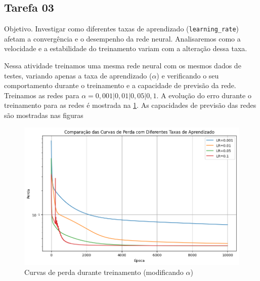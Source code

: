 \subsection{Tarefa 03}

\begin{comandoquestao}
Objetivo. Investigar como diferentes taxas de aprendizado 
(\texttt{learning\_rate}) afetam a 
convergência e o desempenho da rede neural. Analisaremos como a velocidade e a 
estabilidade do treinamento variam com a alteração dessa taxa.
\end{comandoquestao}

Nessa atividade treinamos uma mesma rede neural com os mesmos dados de testes, 
variando apenas a taxa de aprendizado ($\alpha$) e verificando o seu 
comportamento durante 
o treinamento e a capacidade de previsão da rede. Treinamos as redes para 
$\alpha = 0,001 | 0,01 | 0,05 | 0,1$. A evolução do erro durante o treinamento 
para as redes é mostrada na \cref{tarefa03:tabela:curvas}. As 
capacidades de previsão das redes são mostradas nas figuras 

\begin{figure}[tbh]
	\centering
	\caption{Curvas de perda durante treinamento (modificando $\alpha$)}
	\label{tarefa03:tabela:curvas}
	\includegraphics[width=0.7\linewidth]{./0803_imgs/png-241110-180530307-18269409044321663699.png}
\end{figure}


